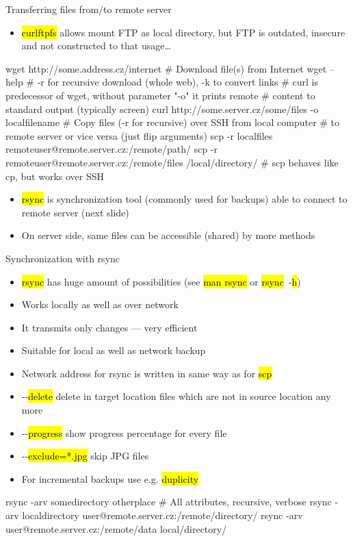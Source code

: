 \documentclass[compress, ucs, xelatex, 11pt, xcolor=svgnames, aspectratio=169,
	hyperref={
		bookmarks=true,
		unicode=true,
		colorlinks=true,
		pdftitle={Linux, command line and MetaCentrum},
		plainpages=false,
		pdfauthor={Vojtech Zeisek},
		pdfsubject={Course about use of Linux command line, writing shell scripts and using MetaCentrum of CESNET},
		pdfcreator={XeLaTeX},
		pdfkeywords={Linux, GNU, BASH, shell, command line, MetaCentrum},
		linkcolor=DarkRed, %
		anchorcolor=DarkBlue, %
		citecolor=Indigo, %
		filecolor=NavyBlue, %
		menucolor=DarkMagenta, %
		urlcolor=DarkBlue, %
		pdftex},
	url={hyphens, lowtilde} %
	]{beamer}
\renewcommand{\texttt}[1]{\hl{\ttfamily #1}}
\begin{document}
\begin{frame}[fragile]{Transferring files from/to remote server}
	\label{transfers}
	\begin{itemize}
		\item \texttt{curlftpfs} allows mount FTP as local directory, but FTP is outdated, insecure and not constructed to that usage\ldots
	\end{itemize}
	\vfill
	\begin{bashcode}
    wget http://some.address.cz/internet # Download file(s) from Internet
    wget --help # -r for recursive download (whole web), -k to convert links
    # curl is predecessor of wget, without parameter "-o" it prints remote
    # content to standard output (typically screen)
    curl http://some.server.cz/some/files -o localfilename
    # Copy files (-r for recursive) over SSH from local computer
    # to remote server or vice versa (just flip arguments)
    scp -r localfiles remoteuser@remote.server.cz:/remote/path/
    scp -r remoteuser@remote.server.cz:/remote/files /local/directory/
    # scp behaves like cp, but works over SSH
	\end{bashcode}
	\vfill
	\begin{itemize}
		\item \texttt{rsync} is synchronization tool (commonly used for backups) able to connect to remote server (next slide)
		\item On server side, same files can be accessible (shared) by more methods
	\end{itemize}
\end{frame}

\begin{frame}[fragile]{Synchronization with rsync}
	\begin{itemize}
		\item \texttt{rsync} has huge amount of possibilities (see \texttt{man rsync} or \texttt{rsync}~-\texttt{h})
		\item Works locally as well as over network
		\item It transmits only changes --- very efficient
		\item Suitable for local as well as network backup
		\item Network address for rsync is written in same way as for \texttt{scp}
		\item -{-}\texttt{delete} delete in target location files which are not in source location any more
		\item -{-}\texttt{progress} show progress percentage for every file
		\item -{-}\texttt{exclude=*.jpg} skip JPG files
		\item For incremental backups use e.g. \texttt{duplicity}
	\end{itemize}
	\vfill
	\begin{bashcode}
    rsync -arv somedirectory otherplace # All attributes, recursive, verbose
    rsync -arv localdirectory user@remote.server.cz:/remote/directory/
    rsync -arv user@remote.server.cz:/remote/data local/directory/
	\end{bashcode}
\end{frame}
\end{document}
